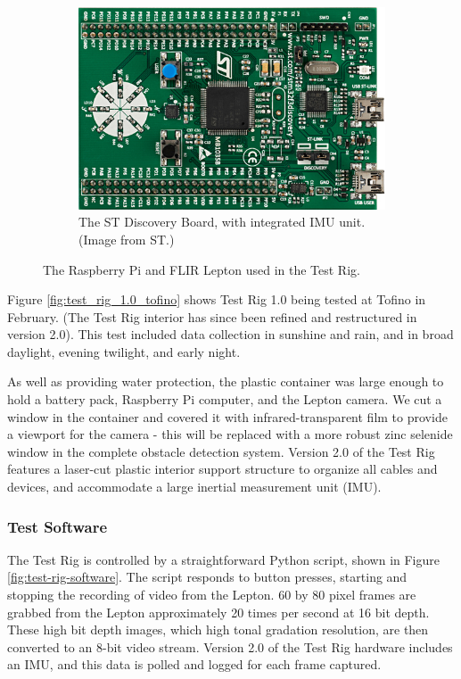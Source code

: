 \begin{figure}
\begin{subfigure}{.45\textwidth}
\centering
\includegraphics[width=.90\linewidth]{"./image/discovery-board"}
\caption[Discovery Board]{\label{fig:discovery-board}The ST Discovery Board, with integrated IMU unit. (Image from ST.)}
\end{subfigure}
\caption[Equipment used in the Test Rig.]{\label{fig:rpi-lepton}The Raspberry Pi and FLIR Lepton used in the Test Rig.}
\end{figure}

Figure \ref{fig:test_rig_1.0_tofino} shows Test Rig 1.0 being tested at Tofino in February. (The Test Rig interior has since been refined and restructured in version 2.0). This test included data collection in sunshine and rain, and in broad daylight, evening twilight, and early night.

As well as providing water protection, the plastic container was large enough to hold a battery pack, Raspberry Pi computer, and  the Lepton camera. We cut a window in the container and covered it with infrared-transparent film to provide a viewport for the camera - this will be replaced with a more robust zinc selenide window in the complete obstacle detection system.  Version 2.0 of the Test Rig features a laser-cut plastic interior support structure to organize all cables and devices, and accommodate a large inertial measurement unit (IMU).  

\subsubsection{\label{sec:discussion:equipment:software}Test Software}
The Test Rig is controlled by a straightforward Python script, shown in Figure \ref{fig:test-rig-software}. The script responds to button presses, starting and stopping the recording of video from the Lepton. 60 by 80 pixel frames are grabbed from the Lepton approximately 20 times per second at 16 bit depth. These high bit depth images, which high tonal gradation resolution, are then converted to an 8-bit video stream. Version 2.0 of the Test Rig hardware includes an IMU, and this data is polled and logged for each frame captured.


